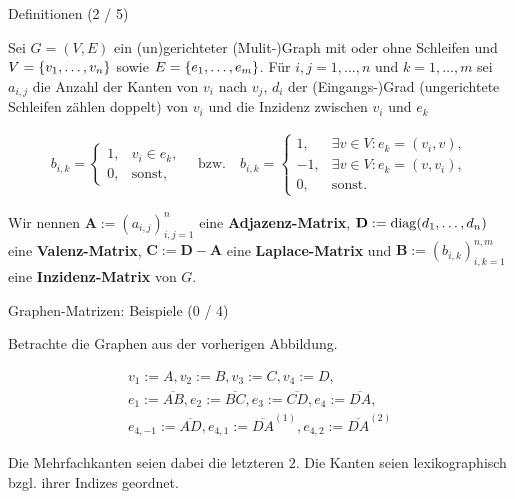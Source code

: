 \documentclass[aspectratio=169]{beamer}
\begin{document}
\begin{frame}{Definitionen (2 / 5)}
    
    \begin{definition*}
        Sei $G = (V, E)$ ein (un)gerichteter (Mulit-)Graph mit oder ohne Schleifen und $V = {\left \{ v_1, \dots, v_n \right \}}$ sowie $E = {\left \{ e_1, \dots, e_m \right \}}$.
        Für $i, j = 1, \dots, n$ und $k = 1, \dots, m$ sei $a_{i, j}$ die Anzahl der Kanten von $v_i$ nach $v_j$, $d_i$ der (Eingangs-)Grad (ungerichtete Schleifen zählen doppelt) von $v_i$ und die Inzidenz zwischen $v_i$ und $e_k$

        \begin{align*}
            b_{i, k}
            =
            \begin{cases}
                1, & v_i \in e_k, \\
                0, & \text{sonst},
            \end{cases}
            \quad
            \text{bzw.}
            \quad
            b_{i, k}
            =
            \begin{cases}
                1, & \exists v \in V: e_k = (v_i, v), \\
             -1, & \exists v \in V: e_k = (v, v_i), \\
                0, & \text{sonst}.
            \end{cases}
        \end{align*}

        Wir nennen $\mathbf A := (a_{i, j})_{i,j=1}^n$ eine \textbf{Adjazenz-Matrix}, $\mathbf D := \operatorname{diag}(d_1, \dots, d_n)$ eine \textbf{Valenz-Matrix}, $\mathbf C := \mathbf D - \mathbf A$ eine \textbf{Laplace-Matrix} und $\mathbf B := (b_{i, k})_{i,k=1}^{n, m}$ eine \textbf{Inzidenz-Matrix} von $G$.

    \end{definition*}
    
\end{frame}

\begin{frame}{Graphen-Matrizen: Beispiele (0 / 4)}

    Betrachte die Graphen aus der vorherigen Abbildung.

    \begin{gather*}
        v_1 := A, v_2 := B, v_3 := C, v_4 := D, \\
        e_1 := \overline{A B},
        e_2 := \overline{B C},
        e_3 := \overline{C D},
        e_4 := \overline{D A}, \\
        e_{4, -1} := \overline{A D},
        e_{4, 1} := \overline{D A}^{(1)},
        e_{4, 2} := \overline{D A}^{(2)}
    \end{gather*}

    Die Mehrfachkanten seien dabei die letzteren $2$.
    Die Kanten seien lexikographisch bzgl. ihrer Indizes geordnet.

\end{frame}
\end{document}
